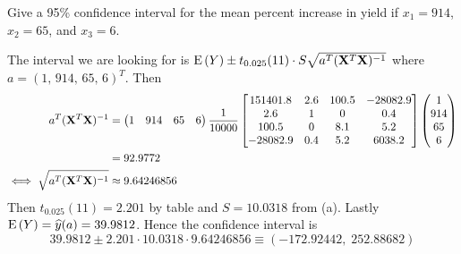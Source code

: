 Give a 95\% confidence interval for the mean percent increase in yield if $x_1 = 914$, $x_2 = 65$, and $x_3 = 6$.

\soln The interval we are looking for is $\E{Y} \pm t_{0.025}(11) \cdot S \sqrt{a^T (\mathbf X^T \mathbf X)^{-1}}$ where\\ $a = (1,\, 914, \, 65, \,6)^T$. Then 
\begin{align*}
    a^T (\mathbf X^T \mathbf X)^{-1} &=
        \begin{pmatrix}
            1 & 914 & 65 & 6
        \end{pmatrix}
        \over{10000}
        \begin{bmatrix}
        151401.8 & 2.6 & 100.5 & -28082.9\\
        2.6 & 1 & 0 & 0.4\\
        100.5 & 0 & 8.1 & 5.2\\
        -28082.9 & 0.4 & 5.2 & 6038.2
        \end{bmatrix}
        \vvec{1}{914}{65}{6}\\
        &= 92.9772\\
        \iff \sqrt{a^T (\mathbf X^T \mathbf X)^{-1}} &\approx 9.64246856
\end{align*}
Then $t_{0.025}(11) = 2.201$ by table and $S = 10.0318$ from (a). Lastly $\E{Y} = \widehat{y}(a) = 39.9812$. Hence the confidence interval is $$39.9812 \pm 2.201 \cdot 10.0318 \cdot 9.64246856 \equiv (-172.92442,\; 252.88682)$$